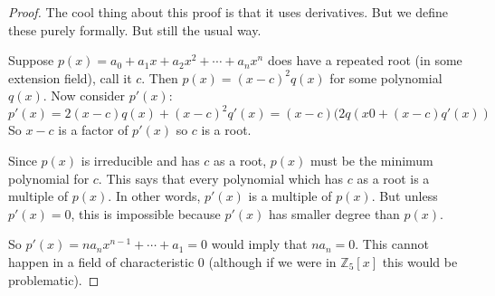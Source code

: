 \documentclass[12pt]{article}
\theoremstyle{plain}
\theoremstyle{definition}
\theoremstyle{remark}
\def\Z{\mathbb Z}
\begin{document}
  \begin{proof}
  The cool thing about this proof is that it uses derivatives.  But we define these purely formally.  But still the usual way.

  Suppose $p(x) = a_0 + a_1x + a_2x^2 + \cdots + a_nx^n$ does have a repeated root (in some extension field), call it $c$.  Then $p(x) = (x-c)^2q(x)$ for some polynomial $q(x)$.  Now consider $p'(x)$:
  \[p'(x) = 2(x-c)q(x) + (x-c)^2q'(x) = (x-c)(2q(x0 + (x-c)q'(x))\]
  So $x-c$ is a factor of $p'(x)$ so $c$ is a root.

  Since $p(x)$ is irreducible and has $c$ as a root, $p(x)$ must be the minimum polynomial for $c$.  This says that every polynomial which has $c$ as a root is a multiple of $p(x)$.  In other words, $p'(x)$ is a multiple of $p(x)$.  But unless $p'(x) = 0$, this is impossible because $p'(x)$ has smaller degree than $p(x)$.  

  So $p'(x) = na_nx^{n-1} + \cdots + a_1 = 0$ would imply that $na_n = 0$.  This cannot happen in a field of characteristic 0  (although if we were in $\Z_5[x]$ this would be problematic).

  \end{proof}
\end{document}
